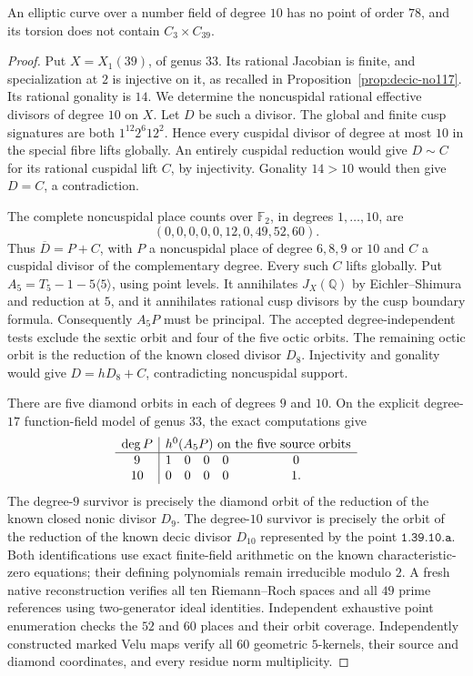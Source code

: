 \begin{proposition}\label{prop:decic-no78}
An elliptic curve over a number field of degree $10$ has no point
of order $78$, and its torsion does not contain $C_3\times C_{39}$.
\end{proposition}
\begin{proof}
Put $X=X_1(39)$, of genus $33$.
Its rational Jacobian is finite, and specialization at $2$ is
injective on it, as recalled in Proposition~\ref{prop:decic-no117}.
Its rational gonality is $14$.
We determine the noncuspidal rational effective divisors of degree
$10$ on $X$.
Let $D$ be such a divisor. The global and finite cusp signatures
are both $1^{12}2^6 12^2$. Hence every cuspidal divisor of degree
at most $10$ in the special fibre lifts globally.
An entirely cuspidal reduction would give $D\sim C$ for its
rational cuspidal lift $C$, by injectivity. Gonality $14>10$
would then give $D=C$, a contradiction.

The complete noncuspidal place counts over $\mathbb F_2$, in
degrees $1,\ldots,10$, are
\[
                       (0,0,0,0,0,12,0,49,52,60).
\]
Thus $\overline D=P+C$, with $P$ a noncuspidal place of degree
$6,8,9$ or $10$ and $C$ a cuspidal divisor of the complementary
degree. Every such $C$ lifts globally.
Put $A_5=T_5-1-5\langle5\rangle$, using point levels.
It annihilates $J_X(\mathbb Q)$ by Eichler--Shimura and reduction
at $5$, and it annihilates rational cusp divisors by the cusp
boundary formula. Consequently $A_5P$ must be principal.
The accepted degree-independent tests exclude the sextic orbit
and four of the five octic orbits. The remaining octic orbit is
the reduction of the known closed divisor $D_8$.
Injectivity and gonality would give $D=hD_8+C$, contradicting
noncuspidal support.

There are five diamond orbits in each of degrees $9$ and $10$.
On the explicit degree-$17$ function-field model of genus $33$,
the exact computations give
\[
\begin{array}{c|ccccc}
\deg P&\multicolumn{5}{c}{h^0(A_5P)\text{ on the five source orbits}}\\
\hline
9&1&0&0&0&0\\
10&0&0&0&0&1.
\end{array}
\]
The degree-$9$ survivor is precisely the diamond orbit of the
reduction of the known closed nonic divisor $D_9$.
The degree-$10$ survivor is precisely the orbit of the reduction
of the known decic divisor $D_{10}$ represented by the point
$\texttt{1.39.10.a}$.
Both identifications use exact finite-field arithmetic on the
known characteristic-zero equations; their defining polynomials
remain irreducible modulo $2$.
A fresh native reconstruction verifies all ten Riemann--Roch
spaces and all $49$ prime references using two-generator ideal
identities. Independent exhaustive point enumeration checks the
$52$ and $60$ places and their orbit coverage.
Independently constructed marked Velu maps verify all $60$
geometric $5$-kernels, their source and diamond coordinates,
and every residue norm multiplicity.


\end{proof}
